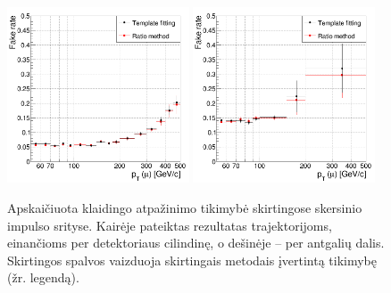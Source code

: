 \documentclass[a4paper, 12pt, oneside]{article}
\begin{document}
\begin{figure}[H]
	\includegraphics[width=0.48\textwidth]{Kursinis3/FR_barrel.png}
	\includegraphics[width=0.48\textwidth]{Kursinis3/FR_endcap.png}
	\caption{\label{fig:FR}
		Apskaičiuota klaidingo atpažinimo tikimybė skirtingose skersinio impulso srityse.
		Kairėje pateiktas rezultatas trajektorijoms, einančioms per detektoriaus cilindinę, o dešinėje -- per antgalių dalis.
		Skirtingos spalvos vaizduoja skirtingais metodais įvertintą tikimybę (žr. legendą).}
\end{figure}
\end{document}
